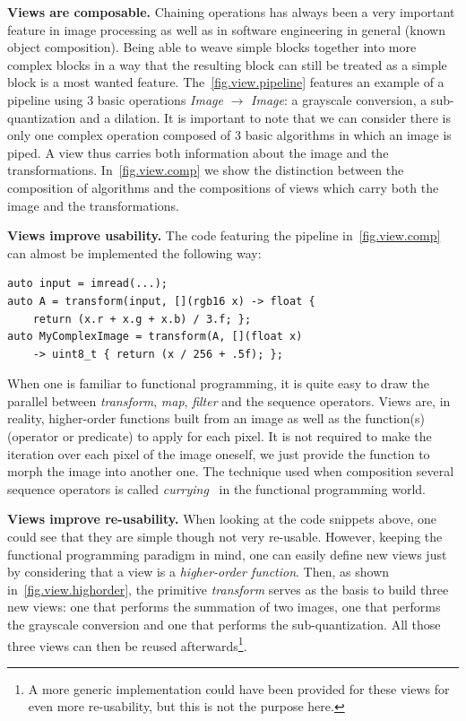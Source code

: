 \textbf{Views are composable.} Chaining operations has always been a very important feature in image processing as well
as in software engineering in general (known object composition). Being able to weave simple blocks together into more
complex blocks in a way that the resulting block can still be treated as a simple block is a most wanted feature.
The~\cref{fig.view.pipeline} features an example of a pipeline using 3 basic operations \emph{Image} $\rightarrow$
\emph{Image}: a grayscale conversion, a sub-quantization and a dilation. It is important to note that we can consider
there is only one complex operation composed of 3 basic algorithms in which an image is piped. A view thus carries both
information about the image and the transformations. In~\cref{fig.view.comp} we show the distinction between the
composition of algorithms and the compositions of views which carry both the image and the transformations.

\textbf{Views improve usability.} The code featuring the pipeline in~\cref{fig.view.comp} can almost be implemented the
following way:
\begin{verbatim}
auto input = imread(...);
auto A = transform(input, [](rgb16 x) -> float {
    return (x.r + x.g + x.b) / 3.f; };
auto MyComplexImage = transform(A, [](float x)
    -> uint8_t { return (x / 256 + .5f); };
\end{verbatim}
When one is familiar to functional programming, it is quite easy to draw the parallel between \emph{transform},
\emph{map}, \emph{filter} and the sequence operators. Views are, in reality, higher-order functions built from an image
as well as the function(s) (operator or predicate) to apply for each pixel. It is not required to make the iteration
over each pixel of the image oneself, we just provide the function to morph the image into another one. The technique
used when composition several sequence operators is called \emph{currying}~\cite{hanus.1995.curry} in the functional
programming world.

\textbf{Views improve re-usability.} When looking at the code snippets above, one could see that they are simple though
not very re-usable. However, keeping the functional programming paradigm in mind, one can easily define new views just
by considering that a view is a \emph{higher-order function}. Then, as shown in~\cref{fig.view.highorder}, the primitive
\emph{transform} serves as the basis to build three new views: one that performs the summation of two images, one that
performs the grayscale conversion and one that performs the sub-quantization. All those three views can then be reused
afterwards\footnote{A more generic implementation could have been provided for these views for even more re-usability,
  but this is not the purpose here.}.

